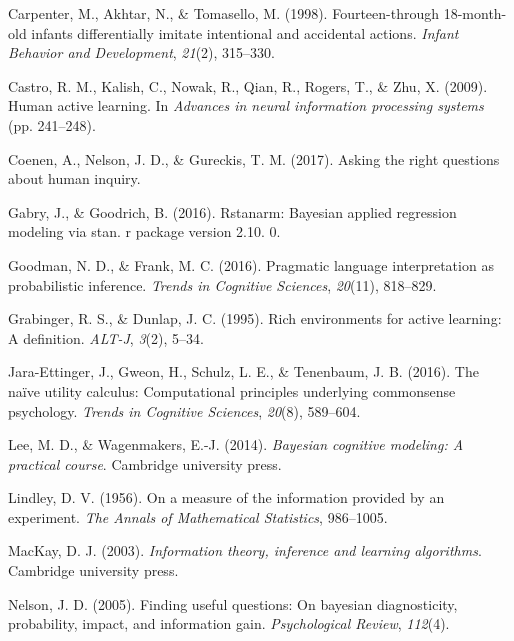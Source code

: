 \documentclass[10pt, letterpaper]{article}
\begin{document}
\setlength{\parindent}{-0.1in} \setlength{\leftskip}{0.125in} \noindent

\hypertarget{refs}{}
\hypertarget{ref-carpenter1998fourteen}{}
Carpenter, M., Akhtar, N., \& Tomasello, M. (1998). Fourteen-through
18-month-old infants differentially imitate intentional and accidental
actions. \emph{Infant Behavior and Development}, \emph{21}(2), 315--330.

\hypertarget{ref-castro2009human}{}
Castro, R. M., Kalish, C., Nowak, R., Qian, R., Rogers, T., \& Zhu, X.
(2009). Human active learning. In \emph{Advances in neural information
processing systems} (pp. 241--248).

\hypertarget{ref-coenen2017}{}
Coenen, A., Nelson, J. D., \& Gureckis, T. M. (2017). Asking the right
questions about human inquiry.

\hypertarget{ref-gabry2016rstanarm}{}
Gabry, J., \& Goodrich, B. (2016). Rstanarm: Bayesian applied regression
modeling via stan. r package version 2.10. 0.

\hypertarget{ref-goodman2016}{}
Goodman, N. D., \& Frank, M. C. (2016). Pragmatic language
interpretation as probabilistic inference. \emph{Trends in Cognitive
Sciences}, \emph{20}(11), 818--829.

\hypertarget{ref-grabinger1995rich}{}
Grabinger, R. S., \& Dunlap, J. C. (1995). Rich environments for active
learning: A definition. \emph{ALT-J}, \emph{3}(2), 5--34.

\hypertarget{ref-jara2016}{}
Jara-Ettinger, J., Gweon, H., Schulz, L. E., \& Tenenbaum, J. B. (2016).
The naïve utility calculus: Computational principles underlying
commonsense psychology. \emph{Trends in Cognitive Sciences},
\emph{20}(8), 589--604.

\hypertarget{ref-lee2014bayesian}{}
Lee, M. D., \& Wagenmakers, E.-J. (2014). \emph{Bayesian cognitive
modeling: A practical course}. Cambridge university press.

\hypertarget{ref-lindley1956}{}
Lindley, D. V. (1956). On a measure of the information provided by an
experiment. \emph{The Annals of Mathematical Statistics}, 986--1005.

\hypertarget{ref-mackay2003}{}
MacKay, D. J. (2003). \emph{Information theory, inference and learning
algorithms}. Cambridge university press.

\hypertarget{ref-nelson2005}{}
Nelson, J. D. (2005). Finding useful questions: On bayesian
diagnosticity, probability, impact, and information gain.
\emph{Psychological Review}, \emph{112}(4).
\end{document}

